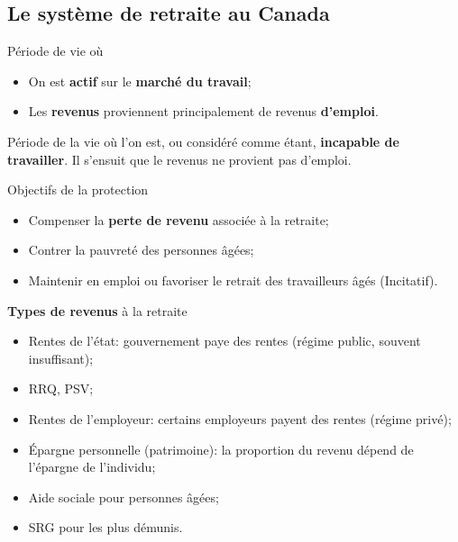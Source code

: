 \documentclass[10pt, french]{article}
\begin{document}
\begin{multicols*}{3}
\section{Le système de retraite au Canada}

\begin{definitionNOHFILL}
Période de vie où 
\begin{itemize}[leftmargin = *]
	\item	On est \textbf{actif} sur le \textbf{marché du travail};
	\item	Les \textbf{revenus} proviennent principalement de revenus \textbf{d'emploi}.
\end{itemize}
\end{definitionNOHFILL}

\begin{definitionNOHFILL}[La retraite]
Période de la vie où l'on est, ou considéré comme étant, \textbf{incapable de travailler}. Il s'ensuit que le revenus ne provient pas d'emploi.

\begin{conceptgen}{Objectifs de la protection}
\begin{itemize}[leftmargin = *]
	\item	Compenser la \textbf{perte de revenu} associée à la retraite;
	\item	Contrer la pauvreté des personnes âgées;
	\item	Maintenir en emploi ou favoriser le retrait des travailleurs âgés (Incitatif).
\end{itemize}
\end{conceptgen} 

\begin{conceptgen}{\textbf{Types de revenus} à la retraite}
\begin{itemize}[leftmargin = *]
	\item	Rentes de l'état: gouvernement paye des rentes (régime public, souvent insuffisant);
	\item[] RRQ, PSV;
	\item	Rentes de l'employeur: certains employeurs payent des rentes (régime privé);
	\item	Épargne personnelle (patrimoine): la proportion du revenu dépend de l'épargne de l'individu;
	\item	Aide sociale pour personnes âgées;
	\item[] SRG pour les plus démunis.
\end{itemize}
\end{conceptgen} 
\end{definitionNOHFILL}


\end{multicols*}
\end{document}
